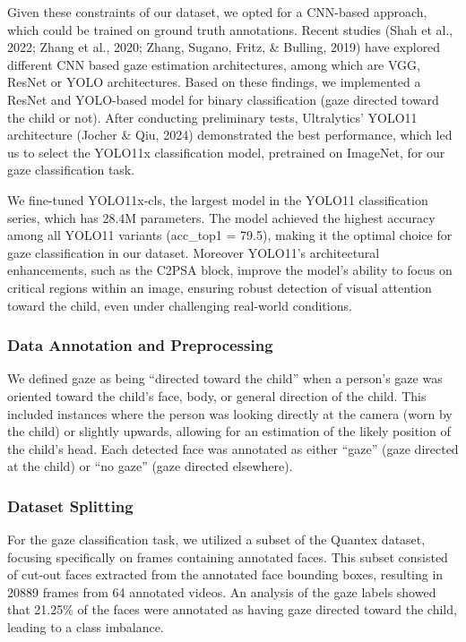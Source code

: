 \documentclass[
  man,floatsintext]{apa6}
\begin{document}
Given these constraints of our dataset, we opted for a CNN-based approach, which could be trained on ground truth annotations. Recent studies (Shah et al., 2022; Zhang et al., 2020; Zhang, Sugano, Fritz, \& Bulling, 2019) have explored different CNN based gaze estimation architectures, among which are VGG, ResNet or YOLO architectures. Based on these findings, we implemented a ResNet and YOLO-based model for binary classification (gaze directed toward the child or not). After conducting preliminary tests, Ultralytics' YOLO11 architecture (Jocher \& Qiu, 2024) demonstrated the best performance, which led us to select the YOLO11x classification model, pretrained on ImageNet, for our gaze classification task.

We fine-tuned YOLO11x-cls, the largest model in the YOLO11 classification series, which has 28.4M parameters. The model achieved the highest accuracy among all YOLO11 variants (acc\_top1 = 79.5), making it the optimal choice for gaze classification in our dataset. Moreover YOLO11's architectural enhancements, such as the C2PSA block, improve the model's ability to focus on critical regions within an image, ensuring robust detection of visual attention toward the child, even under challenging real-world conditions.

\subsubsection{Data Annotation and Preprocessing}\label{data-annotation-and-preprocessing-1}

We defined gaze as being ``directed toward the child'' when a person's gaze was oriented toward the child's face, body, or general direction of the child. This included instances where the person was looking directly at the camera (worn by the child) or slightly upwards, allowing for an estimation of the likely position of the child's head. Each detected face was annotated as either ``gaze'' (gaze directed at the child) or ``no gaze'' (gaze directed elsewhere).

\subsubsection{Dataset Splitting}\label{dataset-splitting-1}

For the gaze classification task, we utilized a subset of the Quantex dataset, focusing specifically on frames containing annotated faces. This subset consisted of cut-out faces extracted from the annotated face bounding boxes, resulting in 20889 frames from 64 annotated videos. An analysis of the gaze labels showed that 21.25\% of the faces were annotated as having gaze directed toward the child, leading to a class imbalance.
\end{document}
